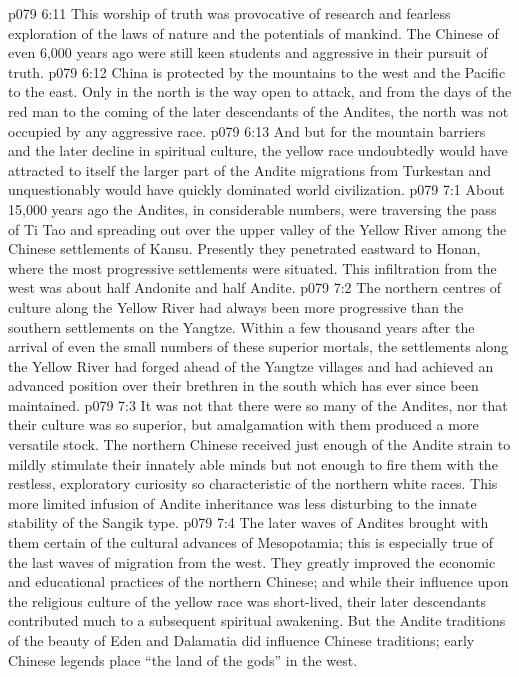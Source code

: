 \vs p079 6:11 This worship of truth was provocative of research and fearless exploration of the laws of nature and the potentials of mankind. The Chinese of even 6,000 years ago were still keen students and aggressive in their pursuit of truth.
\vs p079 6:12 \bibnobreakspace {} China is protected by the mountains to the west and the Pacific to the east. Only in the north is the way open to attack, and from the days of the red man to the coming of the later descendants of the Andites, the north was not occupied by any aggressive race.
\vs p079 6:13 And but for the mountain barriers and the later decline in spiritual culture, the yellow race undoubtedly would have attracted to itself the larger part of the Andite migrations from Turkestan and unquestionably would have quickly dominated world civilization.
\vs p079 7:1 About 15,000 years ago the Andites, in considerable numbers, were traversing the pass of Ti Tao and spreading out over the upper valley of the Yellow River among the Chinese settlements of Kansu. Presently they penetrated eastward to Honan, where the most progressive settlements were situated. This infiltration from the west was about half Andonite and half Andite.
\vs p079 7:2 The northern centres of culture along the Yellow River had always been more progressive than the southern settlements on the Yangtze. Within a few thousand years after the arrival of even the small numbers of these superior mortals, the settlements along the Yellow River had forged ahead of the Yangtze villages and had achieved an advanced position over their brethren in the south which has ever since been maintained.
\vs p079 7:3 \pc It was not that there were so many of the Andites, nor that their culture was so superior, but amalgamation with them produced a more versatile stock. The northern Chinese received just enough of the Andite strain to mildly stimulate their innately able minds but not enough to fire them with the restless, exploratory curiosity so characteristic of the northern white races. This more limited infusion of Andite inheritance was less disturbing to the innate stability of the Sangik type.
\vs p079 7:4 \pc The later waves of Andites brought with them certain of the cultural advances of Mesopotamia; this is especially true of the last waves of migration from the west. They greatly improved the economic and educational practices of the northern Chinese; and while their influence upon the religious culture of the yellow race was short\hyp{}lived, their later descendants contributed much to a subsequent spiritual awakening. But the Andite traditions of the beauty of Eden and Dalamatia did influence Chinese traditions; early Chinese legends place “the land of the gods” in the west.
